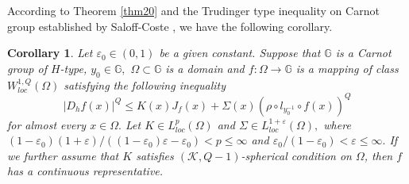 \documentclass[11pt,twoside]{article}
\newtheorem{cor}[thm]{Corollary}
\theoremstyle{definition}
\theoremstyle{remark}
\begin{document}
According to Theorem \ref{thm20} and the Trudinger type inequality on Carnot group established by Saloff-Coste \cite{SC88}, we have the following corollary.
\begin{cor}\label{cor201}
Let $\varepsilon_{0}\in(0,1)$ be a given constant. Suppose that $\mathbb{G}$ is a Carnot group of $H$-type, $y_{0}\in\mathbb{G},$ $\Omega\subset\mathbb{G}$ is a domain and $f:\Omega\rightarrow \mathbb{G}$ is a mapping of class $W_{loc}^{1,Q}(\Omega)$ satisfying  the following inequality
$$\vert D_{h}f(x)\vert^{Q}\leq K(x)J_{f}(x)+\Sigma(x)(\rho\circ l_{y_{0}^{-1}}\circ f(x))^{Q}$$
for almost every $x\in\Omega.$ Let $K\in L_{loc}^{p}(\Omega)$ and $\Sigma\in L_{loc}^{1+\varepsilon}(\Omega),$ where $(1-\varepsilon_{0})(1+\varepsilon)/((1-\varepsilon_{0})\varepsilon-\varepsilon_{0})<p\leq\infty$ and $\varepsilon_{0}/(1-\varepsilon_{0})<\varepsilon\leq\infty.$  If we further assume that $K$  satisfies $(\mathcal{K},Q-1)$-spherical condition on $\Omega$, then $f$ has a continuous representative.
\end{cor}
\end{document}
